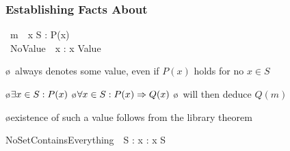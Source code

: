 \begin{frame}
  \frametitle{Establishing Facts About \CHOOSE}

  \qquad\begin{tlablock}
    \DEFINE\ m\ \deq\ \CHOOSE x \in S : P(x)\\
    \DEFINE\ NoValue\ \deq\ \CHOOSE x : x \notin Value
  \end{tlablock}

  \begin{itemize}
  \oo {}

    \begin{itemize}
    \o \CHOOSE\ always denotes some value, even if $P(x)$ holds for no $x \in S$
    \end{itemize}

\pause

  \oo {}

    \begin{itemize}
    \o $\exists x \in S : P(x)$
    \o $\forall x \in S : P(x) \Rightarrow Q(x)$
    \o \tlaps\ will then deduce $Q(m)$
    \end{itemize}

\pause

  \oo {}

    \begin{itemize}
    \o existence of such a value follows from the library theorem

      \medskip

      \begin{tlablock}
        NoSetContainsEverything\ \deq\ \A S : \E x : x \notin S
      \end{tlablock}
    \end{itemize}
  \end{itemize}
\end{frame}

